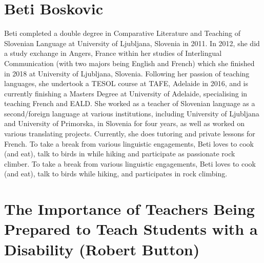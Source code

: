 \documentclass[twoside,12pt,a4paper,notitlepage]{memoir}
\begin{document}
\section*{Beti Boskovic}

Beti completed a double degree in Comparative Literature and Teaching of Slovenian Language at University of Ljubljana, Slovenia in 2011. In 2012, she did a study exchange in Angers, France within her studies of Interlingual Communication (with two majors being English and French) which she finished in 2018 at University of Ljubljana, Slovenia. Following her passion of teaching languages, she undertook a TESOL course at TAFE, Adelaide in 2016, and is currently finishing a Masters Degree at University of Adelaide, specialising in teaching French and EALD.
She worked as a teacher of Slovenian language as a second/foreign language at various institutions, including University of Ljubljana and University of Primorska, in Slovenia for four years, as well as worked on various translating projects. Currently, she does tutoring and private lessons for French.
To take a break from various linguistic engagements, Beti loves to cook (and eat), talk to birds in while hiking and participate as passionate rock climber.
To take a break from various linguistic engagements, Beti loves to cook (and eat), talk to birds while hiking, and participates in rock climbing.



\pagebreak
\section*{The Importance of Teachers Being Prepared to Teach Students with a Disability (Robert Button)}
\label{aut:button}
\end{document}
